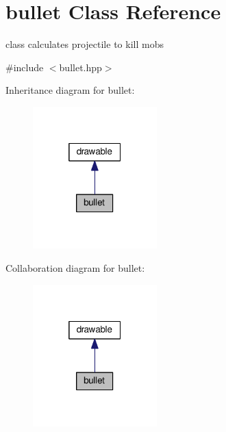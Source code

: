 \hypertarget{classbullet}{}\section{bullet Class Reference}
\label{classbullet}


class calculates projectile to kill mobs  




{\ttfamily \#include $<$bullet.\+hpp$>$}



Inheritance diagram for bullet\+:\nopagebreak
\begin{figure}[H]
\begin{center}
\leavevmode
\includegraphics[width=136pt]{classbullet__inherit__graph}
\end{center}
\end{figure}


Collaboration diagram for bullet\+:\nopagebreak
\begin{figure}[H]
\begin{center}
\leavevmode
\includegraphics[width=136pt]{classbullet__coll__graph}
\end{center}
\end{figure}
